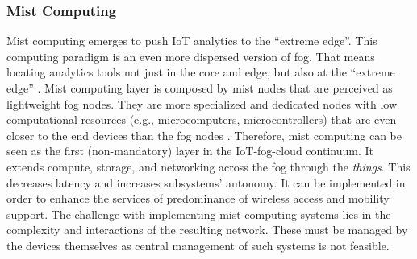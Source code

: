 \subsubsection{Mist Computing}
\noindent Mist computing emerges to push IoT analytics to the ``extreme edge''. This computing paradigm is an even more dispersed version of fog. That means locating analytics tools not just in the core and edge, but also at the ``extreme edge'' \cite{Ciscopus95:online}. Mist computing layer is composed by mist nodes that are perceived as lightweight fog nodes. They are more specialized and dedicated nodes with low computational resources (e.g., microcomputers, microcontrollers) that are even closer to the end devices than the fog nodes \cite{iorga2018fog}. Therefore, mist computing can be seen as the first (non-mandatory) layer in the IoT-fog-cloud continuum. It extends compute, storage, and networking across the fog through the \textit{things}. This decreases latency and increases subsystems' autonomy. It can be implemented in order to enhance the services of predominance of wireless access and mobility support. The challenge with implementing mist computing systems lies in the complexity and interactions of the resulting network. These must be managed by the devices themselves as central management of such systems is not feasible.

